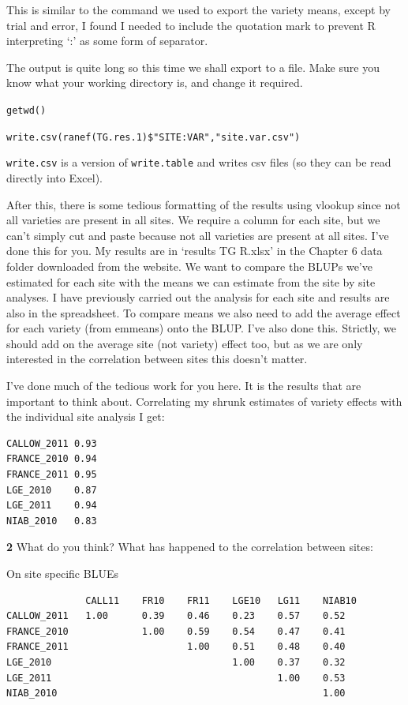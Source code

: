 \documentclass[
]{book}
\makeatletter
\newenvironment{kframe}{%
\medskip{}
\setlength{\fboxsep}{.8em}
 \def\at@end@of@kframe{}%
 \ifinner\ifhmode%
  \def\at@end@of@kframe{\end{minipage}}%
  \begin{minipage}{\columnwidth}%
 \fi\fi%
 \def\FrameCommand##1{\hskip\@totalleftmargin \hskip-\fboxsep
 \colorbox{shadecolor}{##1}\hskip-\fboxsep
     \hskip-\linewidth \hskip-\@totalleftmargin \hskip\columnwidth}%
 \MakeFramed {\advance\hsize-\width
   \@totalleftmargin\z@ \linewidth\hsize
   \@setminipage}}%
 {\par\unskip\endMakeFramed%
 \at@end@of@kframe}
\newenvironment{rmdblock}[1]
  {
  \begin{itemize}
  \renewcommand{\labelitemi}{
    \raisebox{-.7\height}[0pt][0pt]{
      {\setkeys{Gin}{width=3em,keepaspectratio}\texttt{[image: images/\#1]}}
    }
  }
  \setlength{\fboxsep}{1em}
  \begin{kframe}
  \item
  }
  {
  \end{kframe}
  \end{itemize}
  }
\newenvironment{rmdquiz}
  {\begin{rmdblock}{quiz}}
  {\end{rmdblock}}
\makeatother
\begin{document}
This is similar to the command we used to export the variety means, except by trial and error, I found I needed to include the quotation mark to prevent R interpreting `:' as some form of separator.

The output is quite long so this time we shall export to a file. Make sure you know what your working directory is, and change it required.

\texttt{getwd()}

\texttt{write.csv(ranef(TG.res.1)\$"SITE:VAR","site.var.csv")}

\texttt{write.csv} is a version of \texttt{write.table} and writes csv files (so they can be read directly into Excel).

After this, there is some tedious formatting of the results using vlookup since not all varieties are present in all sites. We require a column for each site, but we can't simply cut and paste because not all varieties are present at all sites. I've done this for you. My results are in `results TG R.xlsx' in the Chapter 6 data folder downloaded from the website. We want to compare the BLUPs we've estimated for each site with the means we can estimate from the site by site analyses. I have previously carried out the analysis for each site and results are also in the spreadsheet. To compare means we also need to add the average effect for each variety (from emmeans) onto the BLUP. I've also done this. Strictly, we should add on the average site (not variety) effect too, but as we are only interested in the correlation between sites this doesn't matter.

I've done much of the tedious work for you here. It is the results that are important to think about. Correlating my shrunk estimates of variety effects with the individual site analysis I get:

\begin{verbatim}
CALLOW_2011 0.93
FRANCE_2010 0.94
FRANCE_2011 0.95
LGE_2010    0.87
LGE_2011    0.94
NIAB_2010   0.83
\end{verbatim}

\begin{rmdquiz}
\textbf{2}
What do you think? What has happened to the correlation between sites:
\end{rmdquiz}

On site specific BLUEs

\begin{verbatim}
              CALL11    FR10    FR11    LGE10   LG11    NIAB10
CALLOW_2011   1.00      0.39    0.46    0.23    0.57    0.52
FRANCE_2010             1.00    0.59    0.54    0.47    0.41
FRANCE_2011                     1.00    0.51    0.48    0.40
LGE_2010                                1.00    0.37    0.32
LGE_2011                                        1.00    0.53
NIAB_2010                                               1.00
\end{verbatim}
\end{document}
